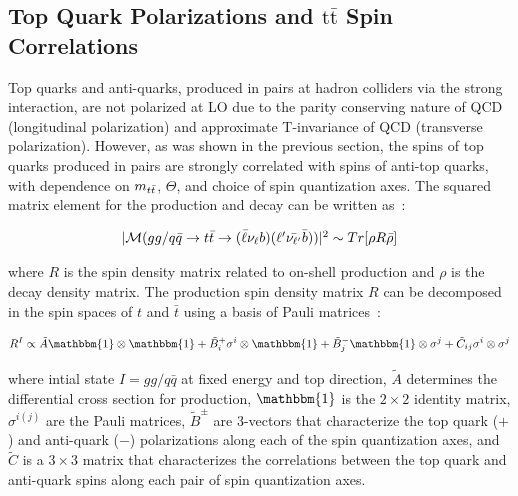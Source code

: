 \begin{refsection}
\section{Top Quark Polarizations and \ensuremath{\mathrm{t\bar{t}}} Spin Correlations}
\label{Top_Quark_Polarizations_and_ttbar_Spin_Correlations}
Top quarks and anti-quarks, produced in \ttbar pairs at hadron colliders via the strong interaction, are not polarized at LO due to the parity conserving nature of QCD (longitudinal polarization) and approximate T-invariance of QCD (transverse polarization).
However, as was shown in the previous section, the spins of top quarks produced in \ttbar pairs are strongly correlated with spins of anti-top quarks, with dependence on $m_{t\bar{t}}$, $\Theta$, and choice of spin quantization axes. 
The squared matrix element for the \ttbar production and decay can be written as~\cite{Bernreuther}:
\begin{linenomath*}
\begin{align}
\begin{array}{c}
\vert\mathcal{M}(gg/q\bar{q} \to t\bar{t} \to (\bar{\ell} \nu_\ell b)(\ell^\prime \bar{\nu_{\ell^\prime}} \bar{b}) )\vert^2 \sim Tr[\rho R \bar{\rho}]
\end{array}
\label{ttbar_squared_matrix_element}
\end{align}
\end{linenomath*}
where $R$ is the spin density matrix related to on-shell \ttbar production and $\rho$ is the decay density matrix.
The production spin density matrix $R$ can be decomposed in the spin spaces of $t$ and $\bar{t}$ using a basis of Pauli matrices~\cite{Bernreuther}:
\begin{linenomath*}
\begin{align}
R^I \propto \tilde{A} \mathbbm{1} \otimes  \mathbbm{1} + \tilde{B}_i^+ \sigma^i \otimes \mathbbm{1} + \tilde{B}_j^- \mathbbm{1} \otimes \sigma^j + \tilde{C}_{ij} \sigma^i \otimes \sigma^j
\label{spin_density_matrix_decomposition}
\end{align}
\end{linenomath*}
where intial state $I = gg / q\bar{q}$ at fixed energy and top direction, $\tilde{A}$ determines the differential cross section for \ttbar production, $\mathbbm{1}$ is the $2\times2$ identity matrix, $\sigma^{i(j)}$ are the Pauli matrices, $\tilde{B}^\pm$ are 3-vectors that characterize the top quark ($+$) and anti-quark ($-$) polarizations along each of the spin quantization axes, and $\tilde{C}$ is a $3\times3$ matrix that characterizes the correlations between the top quark and anti-quark spins along each pair of spin quantization axes.

\end{refsection}

